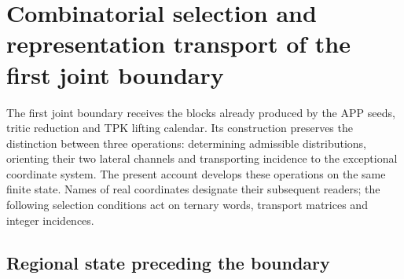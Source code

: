 
\section[Selection and transport of the first boundary]{Combinatorial selection and representation transport of the first joint boundary}
\label{r36c:sec:frontera}

The first joint boundary receives the blocks already produced by the APP seeds, tritic reduction and TPK lifting calendar. Its construction preserves the distinction between three operations: determining admissible distributions, orienting their two lateral channels and transporting incidence to the exceptional coordinate system. The present account develops these operations on the same finite state. Names of real coordinates designate their subsequent readers; the following selection conditions act on ternary words, transport matrices and integer incidences.

\subsection{Regional state preceding the boundary}

